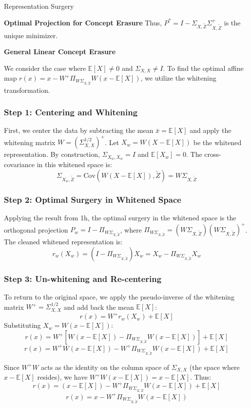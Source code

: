\begin{question}{Representation Surgery}
\begin{subquestion}{\textbf{Optimal Projection for Concept Erasure}}
Thus, $P^* = I - \Sigma_{X,\tilde{Z}}\Sigma_{X,\tilde{Z}}^{+}$ is the unique minimizer.
\end{subquestion}

\begin{subquestion}{\textbf{General Linear Concept Erasure}}

We consider the case where $\mathbb{E}[X] \neq 0$ and $\Sigma_{X,X} \neq I$. To find the optimal affine map $r(x) = x - W^{+}\Pi_{W\Sigma_{X,\tilde{Z}}}W(x-\mathbb{E}[X])$, we utilize the whitening transformation.

\subsubsection*{Step 1: Centering and Whitening}
First, we center the data by subtracting the mean $\bar{x} = \mathbb{E}[X]$ and apply the whitening matrix $W = (\Sigma_{X,X}^{1/2})^{+}$. Let $X_{w} = W(X - \mathbb{E}[X])$ be the whitened representation. By construction, $\Sigma_{X_w, X_w} = I$ and $\mathbb{E}[X_w] = 0$. The cross-covariance in this whitened space is:
$$\Sigma_{X_w, \tilde{Z}} = \text{Cov}(W(X - \mathbb{E}[X]), \tilde{Z}) = W\Sigma_{X,\tilde{Z}}$$

\subsubsection*{Step 2: Optimal Surgery in Whitened Space}
Applying the result from 1h, the optimal surgery in the whitened space is the orthogonal projection $P_w = I - \Pi_{W\Sigma_{X,\tilde{Z}}}$, where $\Pi_{W\Sigma_{X,\tilde{Z}}} = (W\Sigma_{X,\tilde{Z}})(W\Sigma_{X,\tilde{Z}})^{+}$. The cleaned whitened representation is:
$$r_w(X_w) = (I - \Pi_{W\Sigma_{X,\tilde{Z}}})X_w = X_w - \Pi_{W\Sigma_{X,\tilde{Z}}}X_w$$

\subsubsection*{Step 3: Un-whitening and Re-centering}
To return to the original space, we apply the pseudo-inverse of the whitening matrix $W^{+} = \Sigma_{X,X}^{1/2}$ and add back the mean $\mathbb{E}[X]$:
$$r(x) = W^{+} r_w(X_w) + \mathbb{E}[X]$$
Substituting $X_w = W(x - \mathbb{E}[X])$:
$$r(x) = W^{+} [W(x - \mathbb{E}[X]) - \Pi_{W\Sigma_{X,\tilde{Z}}}W(x - \mathbb{E}[X])] + \mathbb{E}[X]$$
$$r(x) = W^{+}W(x - \mathbb{E}[X]) - W^{+}\Pi_{W\Sigma_{X,\tilde{Z}}}W(x - \mathbb{E}[X]) + \mathbb{E}[X]$$

Since $W^{+}W$ acts as the identity on the column space of $\Sigma_{X,X}$ (the space where $x - \mathbb{E}[X]$ resides), we have $W^{+}W(x - \mathbb{E}[X]) = x - \mathbb{E}[X]$. Thus:
$$r(x) = (x - \mathbb{E}[X]) - W^{+}\Pi_{W\Sigma_{X,\tilde{Z}}}W(x - \mathbb{E}[X]) + \mathbb{E}[X]$$
$$r(x) = x - W^{+}\Pi_{W\Sigma_{X,\tilde{Z}}}W(x - \mathbb{E}[X])$$


\end{subquestion}
\end{question}
